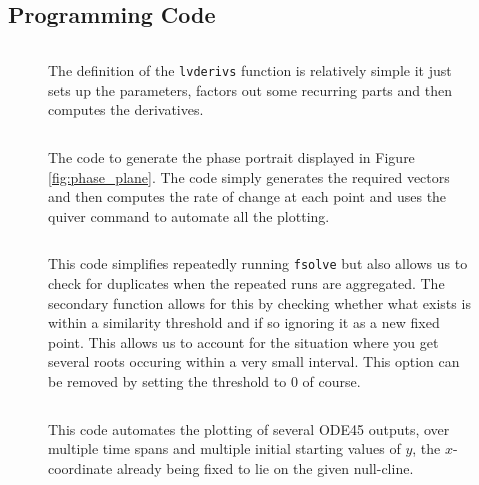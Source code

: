 \documentclass[11pt]{report}
\begin{document}
	\begin{appendices}
		\chapter{Programming Code}
		
		\begin{figure}[h]
			\begin{framed}
				\inputminted[]{matlab}{../lvderivs.m}
			\end{framed}
			\caption{The definition of the \texttt{lvderivs} function is relatively simple it just sets up the parameters, factors out some recurring parts and then computes the derivatives.}
			\label{fig:lvderivs}
		\end{figure}
		
		\begin{figure}[h]
			\begin{framed}
				\begin{center}
					\inputminted[]{matlab}{../phase_portrait.m}
				\end{center}
			\end{framed}
			\caption{The code to generate the phase portrait displayed in Figure \ref{fig:phase_plane}. The code simply generates the required vectors and then computes the rate of change at each point and uses the quiver command to automate all the plotting.}
			\label{fig:phase_plane_plotting_code}
		\end{figure}
		
		\begin{figure}[h]
			\begin{framed}
				\begin{center}
					\inputminted[]{matlab}{../equilibria_finder.m}
				\end{center}
			\end{framed}
			\caption{This code simplifies repeatedly running \texttt{fsolve} but also allows us to check for duplicates when the repeated runs are aggregated. The secondary function allows for this by checking whether what exists is within a similarity threshold and if so ignoring it as a new fixed point. This allows us to account for the situation where you get several roots occuring within a very small interval. This option can be removed by setting the threshold to 0 of course.}
			\label{fig:equilibria_finder_code}
		\end{figure}
		
		\begin{figure}[h]
			\begin{framed}
				\begin{center}
					\inputminted[]{matlab}{../generate_ode45_plots.m}
				\end{center}
			\end{framed}
			\caption{This code automates the plotting of several ODE45 outputs, over multiple time spans and multiple initial starting values of $y$, the $x$-coordinate already being fixed to lie on the given null-cline.}
			\label{fig:plotting_code}
		\end{figure}
		

\end{appendices}
\end{document}
